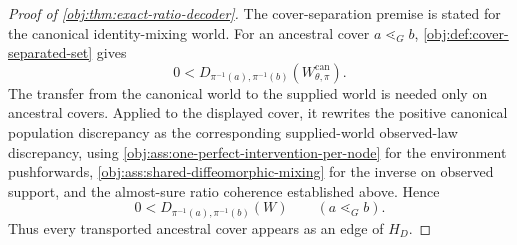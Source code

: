 \documentclass[11pt]{article}
\begin{document}
\begin{proof}[Proof of \cref{obj:thm:exact-ratio-decoder}]
The cover-separation premise is stated for the canonical identity-mixing world. For an ancestral cover \(a\lessdot_G b\), \cref{obj:def:cover-separated-set} gives
\[
0<
D_{\pi^{-1}(a),\pi^{-1}(b)}(W_{\theta,\pi}^{\mathrm{can}}).
\]
The transfer from the canonical world to the supplied world is needed only on ancestral covers. Applied to the displayed cover, it rewrites the positive canonical population discrepancy as the corresponding supplied-world observed-law discrepancy, using \cref{obj:ass:one-perfect-intervention-per-node} for the environment pushforwards, \cref{obj:ass:shared-diffeomorphic-mixing} for the inverse on observed support, and the almost-sure ratio coherence established above. Hence
\begin{equation}
0<
D_{\pi^{-1}(a),\pi^{-1}(b)}(W)
\qquad(a\lessdot_G b).
\label{eq:exact-ratio-decoder-cover-positive}
\end{equation}
Thus every transported ancestral cover appears as an edge of \(H_D\). %


\end{proof}
\end{document}
